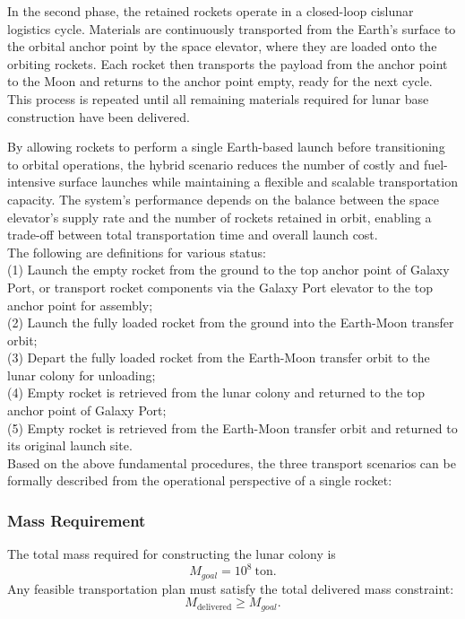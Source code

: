 ﻿\documentclass{mcmthesis}
\begin{document}
In the second phase, the retained rockets operate in a closed-loop cislunar logistics cycle. Materials are continuously transported from the Earth’s surface to the orbital anchor point by the space elevator, where they are loaded onto the orbiting rockets. Each rocket then transports the payload from the anchor point to the Moon and returns to the anchor point empty, ready for the next cycle. This process is repeated until all remaining materials required for lunar base construction have been delivered.

By allowing rockets to perform a single Earth-based launch before transitioning to orbital operations, the hybrid scenario reduces the number of costly and fuel-intensive surface launches while maintaining a flexible and scalable transportation capacity. The system’s performance depends on the balance between the space elevator’s supply rate and the number of rockets retained in orbit, enabling a trade-off between total transportation time and overall launch cost. \\[1.2em]                                                                
The following are definitions for various status:\\[1.2em]
(1) Launch the empty rocket from the ground to the top anchor point of Galaxy Port, or transport rocket components via the Galaxy Port elevator to the top anchor point for assembly;\\
(2) Launch the fully loaded rocket from the ground into the Earth-Moon transfer orbit;\\
(3) Depart the fully loaded rocket from the Earth-Moon transfer orbit to the lunar colony for unloading;\\
(4) Empty rocket is retrieved from the lunar colony and returned to the top anchor point of Galaxy Port;\\
(5) Empty rocket is retrieved from the Earth-Moon transfer orbit and returned to its original launch site.\\[1.2em]
Based on the above fundamental procedures, the three transport scenarios can be formally described from the operational perspective of a single rocket:

\subsubsection{Mass Requirement}
The total mass required for constructing the lunar colony is
\begin{equation}
M_{goal} = 10^8 \ \text{ton}.
\end{equation}
Any feasible transportation plan must satisfy the total delivered mass constraint:
\begin{equation}
M_{\mathrm{delivered}} \ge M_{goal}.
\end{equation}
\end{document}
